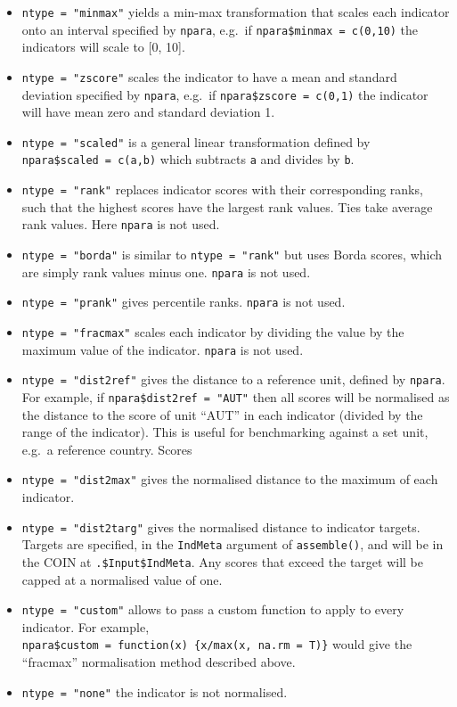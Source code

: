 \documentclass[
]{book}
\providecommand{\tightlist}{%
  \setlength{\itemsep}{0pt}\setlength{\parskip}{0pt}}
\begin{document}
\begin{itemize}
\tightlist
\item
  \texttt{ntype\ =\ "minmax"} yields a min-max transformation that scales each indicator onto an interval specified by \texttt{npara}, e.g.~if \texttt{npara\$minmax\ =\ c(0,10)} the indicators will scale to {[}0, 10{]}.
\item
  \texttt{ntype\ =\ "zscore"} scales the indicator to have a mean and standard deviation specified by \texttt{npara}, e.g.~if \texttt{npara\$zscore\ =\ c(0,1)} the indicator will have mean zero and standard deviation 1.
\item
  \texttt{ntype\ =\ "scaled"} is a general linear transformation defined by \texttt{npara\$scaled\ =\ c(a,b)} which subtracts \texttt{a} and divides by \texttt{b}.
\item
  \texttt{ntype\ =\ "rank"} replaces indicator scores with their corresponding ranks, such that the highest scores have the largest rank values. Ties take average rank values. Here \texttt{npara} is not used.
\item
  \texttt{ntype\ =\ "borda"} is similar to \texttt{ntype\ =\ "rank"} but uses Borda scores, which are simply rank values minus one. \texttt{npara} is not used.
\item
  \texttt{ntype\ =\ "prank"} gives percentile ranks. \texttt{npara} is not used.
\item
  \texttt{ntype\ =\ "fracmax"} scales each indicator by dividing the value by the maximum value of the indicator. \texttt{npara} is not used.
\item
  \texttt{ntype\ =\ "dist2ref"} gives the distance to a reference unit, defined by \texttt{npara}. For example, if \texttt{npara\$dist2ref\ =\ "AUT"} then all scores will be normalised as the distance to the score of unit ``AUT'' in each indicator (divided by the range of the indicator). This is useful for benchmarking against a set unit, e.g.~a reference country. Scores
\item
  \texttt{ntype\ =\ "dist2max"} gives the normalised distance to the maximum of each indicator.
\item
  \texttt{ntype\ =\ "dist2targ"} gives the normalised distance to indicator targets. Targets are specified, in the \texttt{IndMeta} argument of \texttt{assemble()}, and will be in the COIN at \texttt{.\$Input\$IndMeta}. Any scores that exceed the target will be capped at a normalised value of one.
\item
  \texttt{ntype\ =\ "custom"} allows to pass a custom function to apply to every indicator. For example, \texttt{npara\$custom\ =\ function(x)\ \{x/max(x,\ na.rm\ =\ T)\}} would give the ``fracmax'' normalisation method described above.
\item
  \texttt{ntype\ =\ "none"} the indicator is not normalised.
\end{itemize}
\end{document}
